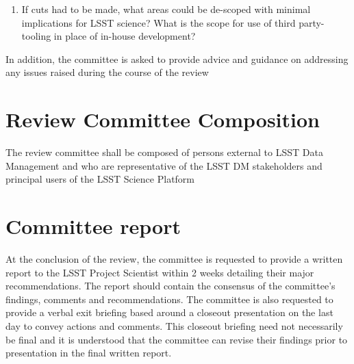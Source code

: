 \documentclass[DM,lsstdraft,STS,toc]{lsstdoc}
\begin{document}
\begin{enumerate}
%
\item If cuts had to be made, what areas could be de-scoped with minimal implications for LSST science? What is the scope for use of third party-tooling in place of in-house development?  \color{red}{(Alternative if DM-10 is approved) In light of the recent implementation of de-scope item DM10: Eliminate the Portal Aspect of the Science Platform, are the the remaining two aspects of the LSP sufficient to 
ensure LSST science harvest covering the four key science themes? What, if any, third party-tooling could be substituted for the Portal aspect to ensure that the LSP can deliver the science promise of LSST?}
\end{enumerate}

In addition, the committee is asked to provide advice and guidance on addressing any issues raised during the course of the review

\section{Review Committee Composition} 
The review committee shall be composed of persons external to LSST Data Management 
and who are representative of the LSST DM stakeholders and principal users of the LSST Science Platform 


\section{Committee report}
 At the conclusion of the review, the  committee is requested to provide a written report  to the LSST Project Scientist within 2 weeks  detailing 
their major recommendations.  The report should contain the consensus of the committee's findings, comments and recommendations. The committee is also requested to 
provide a verbal exit briefing based around a closeout presentation on the last day to convey actions and comments. This closeout briefing need not 
necessarily be final and it is understood that the committee can revise their findings prior to presentation in the final written report. 
\end{document}

